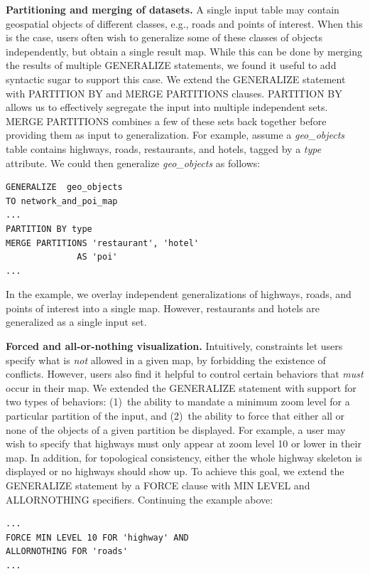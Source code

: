 \documentclass[11pt, oneside]{report}
\newcommand{\minisec}[1]{\noindent\textbf{#1.}}
\begin{document}
{\minisec{Partitioning and merging of datasets} 
A single input table may contain geospatial objects of different classes, e.g., roads and points of interest. When this is the case, users often wish to generalize some of these classes of objects independently, but obtain a single result map. While this can be done by merging the results of multiple GENERALIZE statements, we found it useful to add syntactic sugar to support this case. We extend the GENERALIZE statement with PARTITION BY and MERGE PARTITIONS clauses. PARTITION BY allows us to effectively segregate the input into multiple independent sets. MERGE PARTITIONS combines a few of these sets back together before providing them as input to generalization. For example, assume a \emph{geo\_objects} table contains highways, roads, restaurants, and hotels, tagged by a \emph{type} attribute. We could then generalize \emph{geo\_objects} as follows:

\begin{lstlisting}
GENERALIZE  geo_objects
TO network_and_poi_map
...
PARTITION BY type
MERGE PARTITIONS 'restaurant', 'hotel' 
              AS 'poi'
... 
\end{lstlisting}

In the example, we overlay independent generalizations of highways, roads, and points of interest into a single map. However, restaurants and hotels are generalized as a single input set.  

\minisec{Forced and all-or-nothing visualization}
Intuitively, constraints let users specify what is \emph{not} allowed in a given map, by forbidding the existence of conflicts. However, users also find it helpful to control certain behaviors that \emph{must} occur in their map. We extended the GENERALIZE statement with support for two types of behaviors: (1)~the ability to mandate a minimum zoom level for a particular partition of the input, and (2)~the ability to force that either all or none of the objects of a given partition be displayed. For example, a user may wish to specify that highways must only appear at zoom level 10 or lower in their map. In addition, for topological consistency, either the whole highway skeleton is displayed or no highways should show up. To achieve this goal, we extend the GENERALIZE statement by a FORCE clause with MIN LEVEL and ALLORNOTHING specifiers. Continuing the example above:

\begin{lstlisting}
...
FORCE MIN LEVEL 10 FOR 'highway' AND
ALLORNOTHING FOR 'roads'
... 
\end{lstlisting}

}
\end{document}

